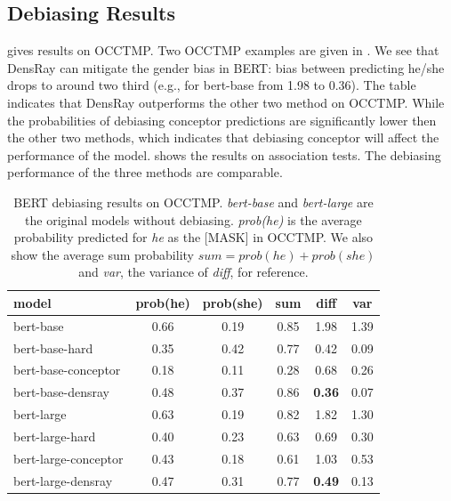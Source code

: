 
\subsection{Debiasing Results}
 gives results on OCCTMP. Two OCCTMP
examples are given in . We see that
DensRay can mitigate the gender bias in BERT: bias between predicting he/she drops to around two
third (e.g., for bert-base from 1.98 to 0.36). The table indicates that DensRay outperforms the other two method on OCCTMP. While the probabilities of debiasing conceptor predictions are significantly lower then the other two methods, which indicates that debiasing conceptor will affect the performance of the model. 
 shows the results on association tests. The debiasing performance of the three methods are comparable.

\begin{table}[ht]
\centering
\footnotesize
\begin{tabular}{lccccc}
\hline
model & prob(he) & prob(she) & sum &diff & var\\
\hline
bert-base & 0.66 & 0.19 & 0.85 &1.98&1.39\\
bert-base-hard & 0.35 & 0.42 & 0.77&0.42&0.09\\
bert-base-conceptor & 0.18 & 0.11 & 0.28 & 0.68&0.26\\
bert-base-densray & 0.48 & 0.37 & 0.86&\textbf{0.36}&0.07\\
\hline
bert-large  & 0.63 & 0.19 & 0.82  &1.82&1.30\\
bert-large-hard & 0.40 & 0.23 & 0.63&0.69&0.30\\
bert-large-conceptor & 0.43 & 0.18 & 0.61 & 1.03&0.53\\
bert-large-densray  & 0.47 & 0.31 & 0.77&\textbf{0.49}&0.13 \\
\hline
\end{tabular}
\caption{ BERT debiasing results on OCCTMP. \textit{bert-base} and \textit{bert-large} are the original models without debiasing. \textit{prob(he)} is
	the average probability predicted for \textit{he} as the [MASK] in OCCTMP. We also show the average sum probability $sum=prob(he)+prob(she)$ and \textit{var}, the variance of \textit{ diff}, for reference.}
\end{table}

